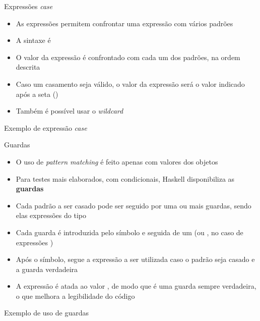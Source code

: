 \begin{frame}[fragile]{Expressões {\it case}}

    \begin{itemize}
        \item As expressões  permitem confrontar uma expressão com vários
            padrões

        \item A sintaxe é


        \item O valor da expressão é confrontado com cada um dos padrões, na ordem descrita

        \item Caso um casamento seja válido, o valor da expressão  será o
            valor indicado após a seta ()

        \item Também é possível usar o \textit{wildcard}
    \end{itemize}

\end{frame}

\begin{frame}[fragile]{Exemplo de expressão {\it case}}
\end{frame}

\begin{frame}[fragile]{Guardas}

    \begin{itemize}
        \item O uso de \textit{pattern matching} é feito apenas com valores dos objetos

        \item Para testes mais elaborados, com condicionais, Haskell disponibiliza as 
            \textbf{guardas}

        \item Cada padrão a ser casado pode ser seguido por uma ou mais guardas, sendo elas
            expressões do tipo 

        \item Cada guarda é introduzida pelo símbolo  e seguida de um
             (ou , no caso de expressões )

        \item Após o símbolo, segue a expressão a ser utilizada caso o padrão seja casado e a
            guarda verdadeira

        \item A expressão  é atada ao valor , de modo
            que é uma guarda sempre verdadeira, o que melhora a legibilidade do código
    \end{itemize}

\end{frame}

\begin{frame}[fragile]{Exemplo de uso de guardas}
\end{frame}
